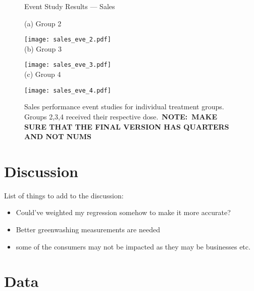 \documentclass[12pt]{article}
\begin{document}
\begin{figure}
    \caption{Event Study Results --- Sales}
    \centering

    (a) Group 2
    
    \texttt{[image: sales\_eve\_2.pdf]} \\
    
    (b) Group 3
    
    \texttt{[image: sales\_eve\_3.pdf]} \\
    
    (c) Group 4
    
    \texttt{[image: sales\_eve\_4.pdf]}
    
    \captionsetup{font=footnotesize}
    \caption*{Sales performance event studies for individual treatment groups. Groups 2,3,4 received their respective dose.\ \textbf{NOTE:~MAKE SURE THAT THE FINAL VERSION HAS QUARTERS AND NOT NUMS}}
\end{figure}


\newpage


\section{Discussion}\label{sect:discussion}

List of things to add to the discussion:
\begin{itemize}
    \item Could've weighted my regression somehow to make it more accurate?
    \item Better greenwashing measurements are needed
    \item some of the consumers may not be impacted as they may be businesses etc.

\end{itemize}


\pagebreak
\printbibliography{}
\pagebreak
\appendix

\section{Data}\label{app:data}
\end{document}
